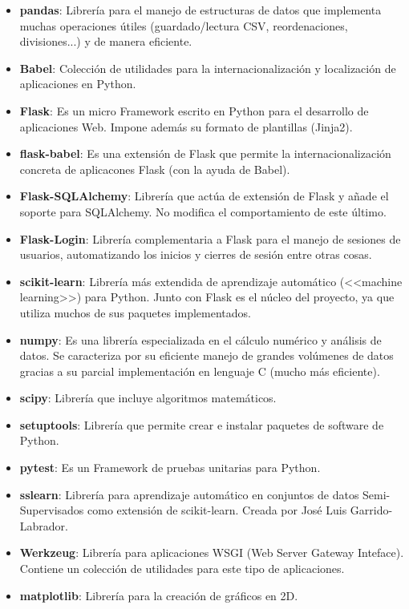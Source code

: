 \begin{itemize}
	\item \textbf{pandas}: Librería para el manejo de estructuras de datos que
	implementa muchas operaciones útiles (guardado/lectura CSV, reordenaciones,
	divisiones...) y de manera eficiente.
	\item \textbf{Babel}: Colección de utilidades para la internacionalización y
	localización de aplicaciones en Python.
	\item \textbf{Flask}: Es un micro Framework escrito en Python para el
	desarrollo de aplicaciones Web. Impone además su formato de plantillas
	(Jinja2).
	\item \textbf{flask-babel}: Es una extensión de Flask que permite la
	internacionalización concreta de aplicacones Flask (con la ayuda de Babel).
	\item \textbf{Flask-SQLAlchemy}: Librería que actúa de extensión de Flask y
	añade el soporte para SQLAlchemy. No modifica el comportamiento de este
	último.
	\item \textbf{Flask-Login}: Librería complementaria a Flask para el manejo
	de sesiones de usuarios, automatizando los inicios y cierres de sesión entre
	otras cosas.
	\item \textbf{scikit-learn}: Librería más extendida de aprendizaje
	automático (<<machine learning>>) para Python. Junto con Flask es el núcleo
	del proyecto, ya que utiliza muchos de sus paquetes implementados.
	\item \textbf{numpy}: Es una librería especializada en el cálculo numérico y
	análisis de datos. Se caracteriza por su eficiente manejo de grandes
	volúmenes de datos gracias a su parcial implementación en lenguaje C (mucho
	más eficiente).
	\item \textbf{scipy}: Librería que incluye algoritmos matemáticos.
	\item \textbf{setuptools}: Librería que permite crear e instalar paquetes de
	software de Python.
	\item \textbf{pytest}: Es un Framework de pruebas unitarias para Python.
	\item \textbf{sslearn}: Librería para aprendizaje automático en conjuntos de
	datos Semi-Supervisados como extensión de scikit-learn. Creada por José Luis
	Garrido-Labrador.
	\item \textbf{Werkzeug}: Librería para aplicaciones WSGI (Web Server Gateway
	Inteface). Contiene un colección de utilidades para este tipo de
	aplicaciones.
	\item \textbf{matplotlib}: Librería para la creación de gráficos en 2D.

\end{itemize}
